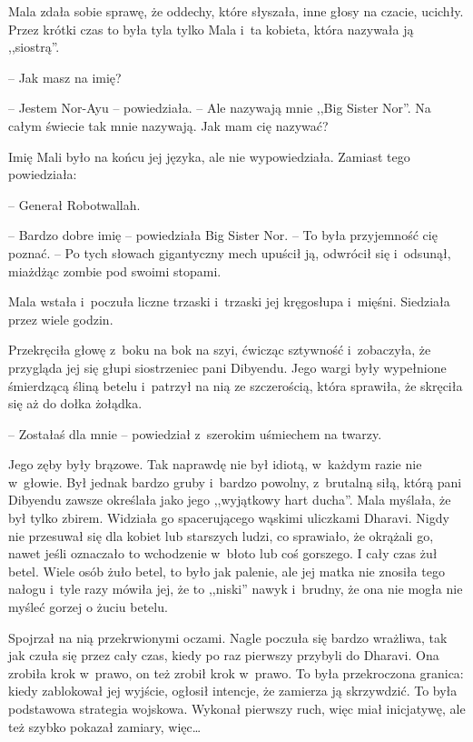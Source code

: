 \documentclass[oneside,polish,11pt,rmheadings]{mwbk}
\begin{document}
Mala zdała sobie sprawę, że oddechy, które słyszała, inne głosy na czacie, ucichły. Przez krótki czas to była tyla tylko Mala i~ta kobieta, która nazywała ją ,,siostrą''. 


-- Jak masz na imię? 


-- Jestem Nor-Ayu -- powiedziała. -- Ale nazywają mnie ,,Big Sister Nor''. Na całym świecie tak mnie nazywają. Jak mam cię nazywać? 


Imię Mali było na końcu jej języka, ale nie wypowiedziała. Zamiast tego powiedziała: 

-- Generał Robotwallah. 


-- Bardzo dobre imię -- powiedziała Big Sister Nor. -- To była przyjemność cię poznać. -- Po tych słowach gigantyczny mech upuścił ją, odwrócił się i~odsunął, miażdżąc zombie pod swoimi stopami. 


Mala wstała i~poczuła liczne trzaski i~trzaski jej kręgosłupa i~mięśni. Siedziała przez wiele godzin. 


Przekręciła głowę z~boku na bok na szyi, ćwicząc sztywność i~zobaczyła, że przygląda jej się głupi siostrzeniec pani Dibyendu. Jego wargi były wypełnione śmierdzącą śliną betelu i~patrzył na nią ze szczerością, która sprawiła, że skręciła się aż do dołka żołądka. 


-- Zostałaś dla mnie -- powiedział z~szerokim uśmiechem na twarzy.

 Jego zęby były brązowe. Tak naprawdę nie był idiotą, w~każdym razie nie w~głowie. Był jednak bardzo gruby i~bardzo powolny, z~brutalną siłą, którą pani Dibyendu zawsze określała jako jego ,,wyjątkowy hart ducha''. Mala myślała, że był tylko zbirem. Widziała go spacerującego wąskimi uliczkami Dharavi. Nigdy nie przesuwał się dla kobiet lub starszych ludzi, co sprawiało, że okrążali go, nawet jeśli oznaczało to wchodzenie w~błoto lub coś gorszego. I cały czas żuł betel. Wiele osób żuło betel, to było jak palenie, ale jej matka nie znosiła tego nałogu i~tyle razy mówiła jej, że to ,,niski'' nawyk i~brudny, że ona nie mogła nie myśleć gorzej o żuciu betelu. 


Spojrzał na nią przekrwionymi oczami. Nagle poczuła się bardzo wrażliwa, tak jak czuła się przez cały czas, kiedy po raz pierwszy przybyli do Dharavi. Ona zrobiła krok w~prawo, on też zrobił krok w~prawo. To była przekroczona granica: kiedy zablokował jej wyjście, ogłosił intencje, że zamierza ją skrzywdzić. To była podstawowa strategia wojskowa. Wykonał pierwszy ruch, więc miał inicjatywę, ale też szybko pokazał zamiary, więc\ldots  
\end{document}

